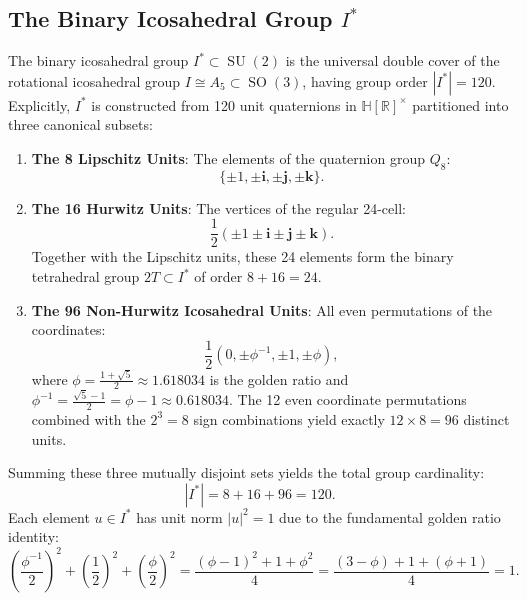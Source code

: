 \documentclass[11pt,a4paper]{article}
\theoremstyle{definition}
\DeclareMathOperator{\SU}{SU}
\DeclareMathOperator{\SO}{SO}
\begin{document}
\subsection{The Binary Icosahedral Group $I^*$}
The binary icosahedral group $I^* \subset \SU(2)$ is the universal double cover of the rotational icosahedral group $I \cong A_5 \subset \SO(3)$, having group order $|I^*| = 120$. Explicitly, $I^*$ is constructed from 120 unit quaternions in $\mathbb{H}[\mathbb{R}]^\times$ partitioned into three canonical subsets:
\begin{enumerate}
\item \textbf{The 8 Lipschitz Units}: The elements of the quaternion group $Q_8$:
\begin{equation}
\{\pm 1, \pm \mathbf{i}, \pm \mathbf{j}, \pm \mathbf{k}\}.
\end{equation}
\item \textbf{The 16 Hurwitz Units}: The vertices of the regular 24-cell:
\begin{equation}
\frac{1}{2} (\pm 1 \pm \mathbf{i} \pm \mathbf{j} \pm \mathbf{k}).
\end{equation}
Together with the Lipschitz units, these 24 elements form the binary tetrahedral group $2T \subset I^*$ of order $8 + 16 = 24$.
\item \textbf{The 96 Non-Hurwitz Icosahedral Units}: All even permutations of the coordinates:
\begin{equation}
\frac{1}{2} \left( 0, \pm \phi^{-1}, \pm 1, \pm \phi \right),
\end{equation}
where $\phi = \frac{1+\sqrt{5}}{2} \approx 1.618034$ is the golden ratio and $\phi^{-1} = \frac{\sqrt{5}-1}{2} = \phi - 1 \approx 0.618034$. The 12 even coordinate permutations combined with the $2^3 = 8$ sign combinations yield exactly $12 \times 8 = 96$ distinct units.
\end{enumerate}

Summing these three mutually disjoint sets yields the total group cardinality:
\begin{equation}
|I^*| = 8 + 16 + 96 = 120.
\end{equation}
Each element $u \in I^*$ has unit norm $|u|^2 = 1$ due to the fundamental golden ratio identity:
\begin{equation}
\left(\frac{\phi^{-1}}{2}\right)^2 + \left(\frac{1}{2}\right)^2 + \left(\frac{\phi}{2}\right)^2 = \frac{(\phi - 1)^2 + 1 + \phi^2}{4} = \frac{(3-\phi) + 1 + (\phi+1)}{4} = 1.
\end{equation}
\end{document}
